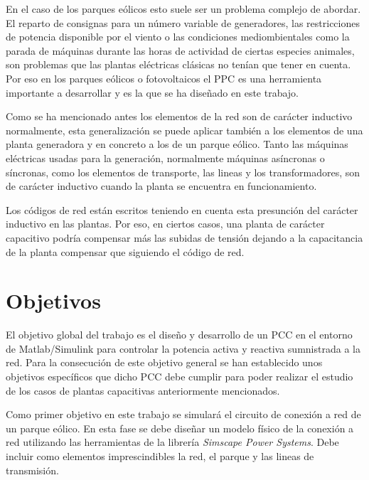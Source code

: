 \documentclass{book}
\begin{document}
En el caso de los parques e\'olicos esto suele ser un problema complejo de abordar. El reparto de consignas para un n\'umero variable de generadores, las restricciones de potencia disponible por el viento o las condiciones mediombientales como la parada de m\'aquinas durante las horas de actividad de ciertas especies animales, son problemas que las plantas el\'ectricas cl\'asicas no ten\'ian que tener en cuenta. Por eso en los parques e\'olicos o fotovoltaicos el PPC es una herramienta importante a desarrollar y es la que se ha diseñado en este trabajo. \par 

Como se ha mencionado antes los elementos de la red son de car\'acter inductivo normalmente, esta generalizaci\'on se puede aplicar tambi\'en a los elementos de una planta generadora y en concreto a los de un parque e\'olico. Tanto las m\'aquinas el\'ectricas usadas para la generaci\'on, normalmente m\'aquinas as\'incronas o s\'incronas, como los elementos de transporte, las lineas y los transformadores, son de car\'acter inductivo cuando la planta se encuentra en funcionamiento.\par

Los c\'odigos de red est\'an escritos teniendo en cuenta esta presunci\'on del car\'acter inductivo en las plantas. Por eso, en ciertos casos, una planta de car\'acter capacitivo podr\'ia compensar m\'as las subidas de tensi\'on dejando a la capacitancia de la planta compensar que siguiendo el c\'odigo de red. \par



	\section{Objetivos}

El objetivo global del trabajo es el diseño y desarrollo de un PCC en el entorno de Matlab/Simulink para controlar la potencia activa y reactiva sumnistrada a la red. Para la consecuci\'on de este objetivo general se han establecido unos objetivos espec\'ificos que dicho PCC debe cumplir para poder realizar el estudio de los casos de plantas capacitivas anteriormente mencionados. \par

Como primer objetivo en este trabajo se simular\'a el circuito de conexi\'on a red de un parque e\'olico. En esta fase se debe diseñar un modelo f\'isico de la conexi\'on a red utilizando las herramientas de la librer\'ia \emph{Simscape Power Systems}. Debe incluir como elementos imprescindibles la red, el parque y las lineas de transmisi\'on. \par
\end{document}
